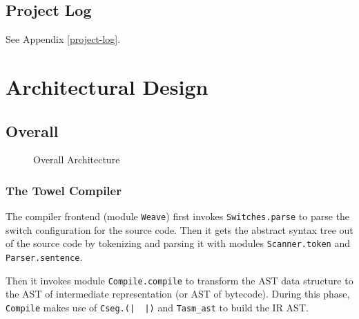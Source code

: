\documentclass{report}
\newcommand{\mtilde}[1]{\textasciitilde}
\begin{document}
\section{Project Log}

See Appendix \autoref{project-log}.

\chapter{Architectural Design}

\section{Overall}

\begin{figure}[H]
  \centering
  
  \caption{Overall Architecture}
  \label{fig:overall}
\end{figure}

\subsection{The Towel Compiler}

  The compiler frontend (module \texttt{Weave}) first invokes \texttt{Switches.parse} to parse the switch configuration for the source code. Then it gets the abstract syntax tree out of the source code by tokenizing and parsing it with modules \texttt{Scanner.token} and \texttt{Parser.sentence}.

  Then it invokes module \texttt{Compile.compile} to transform the AST data structure to the AST of intermediate representation (or AST of bytecode). During this phase, \texttt{Compile} makes use of \texttt{Cseg.(|\mtilde ~\mtilde ~|)} and \texttt{Tasm\_ast} to build the IR AST.
\end{document}
